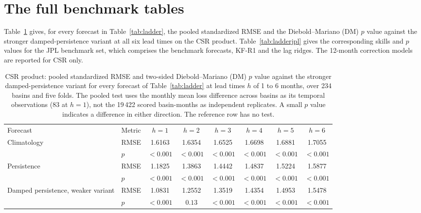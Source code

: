 \documentclass[hess, manuscript]{copernicus}
\begin{document}
\clearpage
\section{The full benchmark tables}
\label{app:ladder}

Table~\ref{tab:ladderfull} gives, for every forecast in
Table~\ref{tab:ladder}, the pooled standardized RMSE and the
Diebold--Mariano (DM) $p$ value against the stronger damped-persistence
variant at all six lead times on the CSR product. Table~\ref{tab:ladderjpl} gives the corresponding skills
and $p$ values for the JPL benchmark set, which comprises the benchmark forecasts, KF-R1
and the lag ridges. The 12-month correction models are reported for
CSR only.

\begin{table}[!htbp]
\caption{CSR product: pooled standardized RMSE and two-sided
Diebold--Mariano (DM) $p$ value against the stronger damped-persistence
variant for every forecast of Table~\ref{tab:ladder} at lead times $h$ of 1
to 6 months, over 234 basins and five folds. The pooled test uses the monthly
mean loss difference across basins as its temporal observations (83 at $h=1$),
not the 19\,422 scored basin-months as independent replicates. A small $p$
value indicates a difference in either direction. The reference row has no test.}
\label{tab:ladderfull}
\begin{tabular}{@{}llcccccc@{}}
\tophline
Forecast & Metric & $h{=}1$ & $h{=}2$ & $h{=}3$ & $h{=}4$ & $h{=}5$ & $h{=}6$ \\
\middlehline
Climatology & RMSE & 1.6163 & 1.6354 & 1.6525 & 1.6698 & 1.6881 & 1.7055 \\
 & $p$ & $<0.001$ & $<0.001$ & $<0.001$ & $<0.001$ & $<0.001$ & $<0.001$ \\
Persistence & RMSE & 1.1825 & 1.3863 & 1.4442 & 1.4837 & 1.5224 & 1.5877 \\
 & $p$ & $<0.001$ & $<0.001$ & $<0.001$ & $<0.001$ & $<0.001$ & $<0.001$ \\
Damped persistence, weaker variant & RMSE & 1.0831 & 1.2552 & 1.3519 & 1.4354 & 1.4953 & 1.5478 \\
 & $p$ & $<0.001$ & $0.13$ & $<0.001$ & $<0.001$ & $<0.001$ & $<0.001$ \\

\end{tabular}
\end{table}
\end{document}
